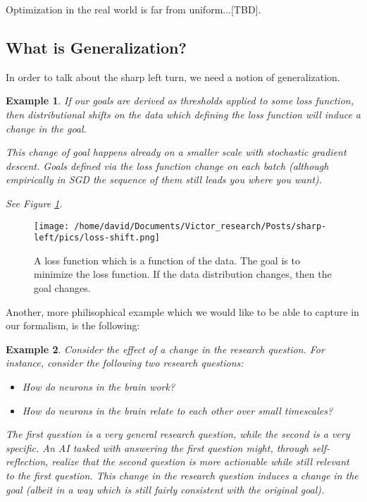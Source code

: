 \documentclass{article}
\newtheorem{example}{Example}
\begin{document}
Optimization in the real world is far from uniform...[TBD].

\subsection{What is Generalization?}
In order to talk about the sharp left turn, we need a notion of generalization.

\begin{example}
If our goals are derived as thresholds applied to some loss function, then distributional shifts on the data which defining the loss function will induce a change in the goal.

This change of goal happens already on a smaller scale with stochastic gradient descent. Goals defined via the loss function change on each batch (although empirically in SGD the sequence of them still leads you where you want).

See Figure \ref{fig:loss-shift}.
\end{example}

\begin{figure}[ht]
    \centering
    \texttt{[image: /home/david/Documents/Victor\_research/Posts/sharp-left/pics/loss-shift.png]} 
    \caption{A loss function which is a function of the data. The goal is to minimize the loss function. If the data distribution changes, then the goal changes.}
    \label{fig:loss-shift} 
\end{figure}

Another, more philisophical example which we would like to be able to capture in our formalism, is the following:

\begin{example}
    Consider the effect of a change in the research question. For instance, consider the following two research questions: 
    \begin{itemize}
        \item How do neurons in the brain work?
        \item How do neurons in the brain relate to each other over small timescales?
    \end{itemize}
    The first question is a very general research question, while the second is a very specific. An AI tasked with answering the first question might, through self-reflection, realize that the second question is more actionable while still relevant to the first question. This change in the research question induces a change in the goal (albeit in a way which is still fairly consistent with the original goal).
\end{example}
\end{document}
